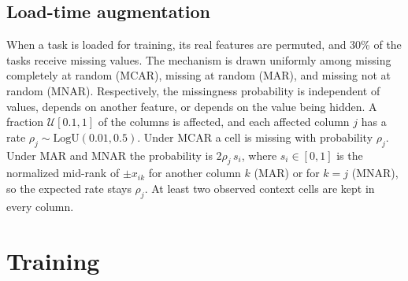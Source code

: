 \documentclass[11pt]{article}
\begin{document}
\subsection{Load-time augmentation}
When a task is loaded for training, its real features are permuted, and 30\% of the tasks receive
missing values. The mechanism is drawn uniformly among missing completely at random (MCAR),
missing at random (MAR), and missing not at random (MNAR). Respectively, the missingness probability
is independent of values, depends on another feature, or depends on the value being hidden.
A fraction
$\mathcal{U}[0.1,1]$ of the columns is affected, and each affected column $j$ has a rate
$\rho_j\sim\mathrm{LogU}(0.01,0.5)$. Under MCAR a cell is missing with probability $\rho_j$. Under MAR
and MNAR the probability is $2\rho_j\,s_i$, where $s_i\in[0,1]$ is the normalized mid-rank of
$\pm x_{ik}$ for another column $k$ (MAR) or for $k=j$ (MNAR), so the expected rate stays $\rho_j$.
At least two observed context cells are kept in every column.

\section{Training}
\label{sec:training}
\end{document}

